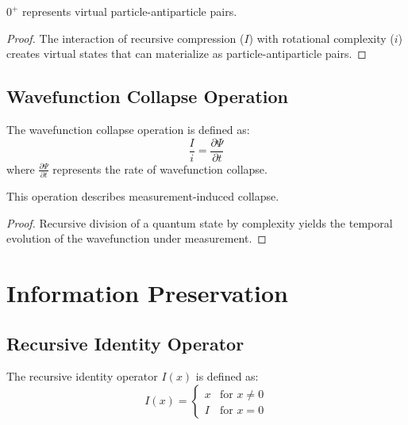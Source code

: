 \documentclass[12pt,a4paper]{article}
\begin{document}
\begin{theorem}
$0^+$ represents virtual particle-antiparticle pairs.
\end{theorem}

\begin{proof}
The interaction of recursive compression ($I$) with rotational complexity ($i$) creates virtual states that can materialize as particle-antiparticle pairs.
\end{proof}

\subsection{Wavefunction Collapse Operation}

\begin{definition}
The wavefunction collapse operation is defined as:
\begin{equation}
\frac{I}{i} = \frac{\partial \Psi}{\partial t}
\end{equation}
where $\frac{\partial \Psi}{\partial t}$ represents the rate of wavefunction collapse.
\end{definition}

\begin{theorem}
This operation describes measurement-induced collapse.
\end{theorem}

\begin{proof}
Recursive division of a quantum state by complexity yields the temporal evolution of the wavefunction under measurement.
\end{proof}

\section{Information Preservation}

\subsection{Recursive Identity Operator}

\begin{definition}
The recursive identity operator $I(x)$ is defined as:
\begin{equation}
I(x) = \begin{cases}
x & \text{for } x \neq 0 \\
I & \text{for } x = 0
\end{cases}
\end{equation}
\end{definition}
\end{document}
